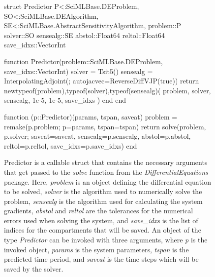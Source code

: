 \begin{figure}[!htb]
\begin{jllisting}
struct Predictor{
    P<:SciMLBase.DEProblem,
    SO<:SciMLBase.DEAlgorithm,
    SE<:SciMLBase.AbstractSensitivityAlgorithm,
}
    problem::P
    solver::SO
    sensealg::SE
    abstol::Float64
    reltol::Float64
    save_idxs::Vector{Int}

    function Predictor(problem::SciMLBase.DEProblem, save_idxs::Vector{Int})
        solver = Tsit5()
        sensealg = InterpolatingAdjoint(; autojacvec=ReverseDiffVJP(true))
        return new{typeof(problem),typeof(solver),typeof(sensealg)}(
            problem, solver, sensealg, 1e-5, 1e-5, save_idxs
        )
    end
end

function (p::Predictor)(params, tspan, saveat)
    problem = remake(p.problem; p=params, tspan=tspan)
    return solve(problem, p.solver;
                 saveat=saveat,
                 sensealg=p.sensealg,
                 abstol=p.abstol,
                 reltol=p.reltol,
                 save_idxs=p.save_idxs)
end
\end{jllisting}
\caption[Julia implementation of a helper struct for solving systems of ODEs]{Predictor is a callable struct that contains the necessary arguments that get passed to the \textit{solve} function from the \textit{DifferentialEquations} package. Here, \textit{problem} is an object defining the differential equation to be solved, \textit{solver} is the algorithm used to numerically solve the problem, \textit{sensealg} is the algorithm used for calculating the system gradients, \textit{abstol} and \textit{reltol} are the tolerances for the numerical errors used when solving the system, and \textit{save\_idxs} is the list of indices for the compartments that will be saved. An object of the type \textit{Predictor} can be invoked with three arguments, where \textit{p} is the invoked object, \textit{params} is the system parameters, \textit{tspan} is the predicted time period, and \textit{saveat} is the time steps which will be saved by the solver.}
\label{fig:diffeq-seird-predictor}
\end{figure}

